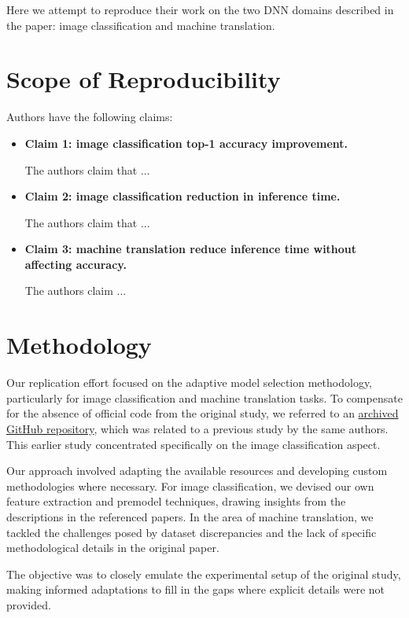 Here we attempt to reproduce their work on the two DNN domains described in the paper: image classification and machine translation.

\section{Scope of Reproducibility}
Authors have the following claims:
\begin{itemize}
    \item \textbf{Claim 1: image classification top-1 accuracy improvement.}

          The authors claim that ...

    \item \textbf{Claim 2: image classification reduction in inference time.}

          The authors claim that ...

    \item \textbf{Claim 3: machine translation reduce inference time without affecting accuracy.}

          The authors claim ...

\end{itemize}


\section{Methodology}

Our replication effort focused on the adaptive model selection methodology, particularly for image classification and machine translation tasks. To compensate for the absence of official code from the original study, we referred to an \href{https://github.com/qwerybot/Adaptive_Deep_Learning}{archived GitHub repository}, which was related to a previous study\supercite{taylor2018adaptive} by the same authors. This earlier study concentrated specifically on the image classification aspect.

Our approach involved adapting the available resources and developing custom methodologies where necessary. For image classification, we devised our own feature extraction and premodel techniques, drawing insights from the descriptions in the referenced papers. In the area of machine translation, we tackled the challenges posed by dataset discrepancies and the lack of specific methodological details in the original paper.

The objective was to closely emulate the experimental setup of the original study, making informed adaptations to fill in the gaps where explicit details were not provided.

